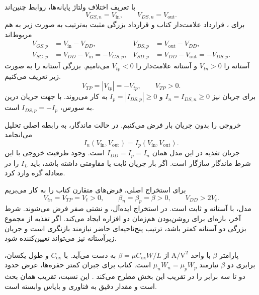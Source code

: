 با تعریف اختلاف ولتاژ پایانه‌ها، روابط  چنین‌اند
\begin{equation}
 V_{GS,n}=V_{\mathrm{in}},\qquad
 V_{DS,n}=V_{\mathrm{out}}.
 \label{eq:inverter-n-voltages}
\end{equation}
برای ، قرارداد علامت‌دار کتاب و قرارداد بزرگی مثبت به‌ترتیب
به صورت زیر به هم مربوط‌اند
\begin{align}
 V_{GS,p}&=V_{\mathrm{in}}-V_{DD},&
 V_{DS,p}&=V_{\mathrm{out}}-V_{DD},
 \label{eq:inverter-p-signed}\\
 V_{SG,p}&=V_{DD}-V_{\mathrm{in}}=-V_{GS,p},&
 V_{SD,p}&=V_{DD}-V_{\mathrm{out}}=-V_{DS,p}.
 \label{eq:inverter-p-magnitudes}
\end{align}
آستانه  را \(V_{tn}>0\) و آستانه علامت‌دار
 را \(V_{tp}<0\) می‌نامیم. بزرگی آستانه را به صورت زیر
تعریف می‌کنیم.
\[
 V_{TP}=|V_{tp}|=-V_{tp},\qquad V_{TP}>0.
\]
برای جریان نیز
\(I_n=I_{DS,n}\ge0\) و \(I_p=|I_{DS,p}|\ge0\) به کار می‌روند.
با جهت جریان درین به سورس، \(I_{DS,p}=-I_p\) است.

خروجی را بدون جریان بار  فرض می‌کنیم. در حالت ماندگار،
 به رابطه اصلی تحلیل می‌انجامد
\begin{equation}
 \boxed{I_n(V_{\mathrm{in}},V_{\mathrm{out}})
       =I_p(V_{\mathrm{in}},V_{\mathrm{out}})}.
 \label{eq:inverter-kcl}
\end{equation}
جریان تغذیه در این مدل همان \(I_{DD}=I_p=I_n\) است. وجود ظرفیت
خروجی با این شرط ماندگار سازگار است. اگر بار جریان ثابت یا مقاومتی
داشته باشد، باید \(I_L\) را در معادله گره وارد کرد.

برای استخراج اصلی، فرض‌های متقارن کتاب را به کار می‌بریم
\begin{equation}
 V_{tn}=V_{TP}=V_t>0,\qquad
 \beta_n=\beta_p=\beta>0,\qquad V_{DD}>2V_t.
 \label{eq:inverter-symmetry}
\end{equation}
مدل،  با آستانه و  ثابت است.
در استخراج ایده‌آل،  و نشتی صفر فرض می‌شوند. شرط آخر،
بازه‌ای برای روشن‌بودن هم‌زمان دو افزاره ایجاد می‌کند. اگر تغذیه
از مجموع بزرگی دو آستانه کمتر باشد، ترتیب پنج‌ناحیه‌ای حاضر
نیازمند بازنگری است و جریان زیرآستانه نیز می‌تواند تعیین‌کننده شود.

پارامتر \(\beta\) با واحد \(\unit{\ampere\per\volt\squared}\)
از \(\beta=\mu C_{\mathrm{ox}}W/L\) به دست می‌آید. با
\(C_{\mathrm{ox}}\) و طول یکسان، برابری دو \(\beta\) نیازمند
\(\mu_nW_n=\mu_pW_p\) است. کتاب برای جبران 
کمتر حفره‌ها، عرض  حدود دو تا سه برابر  را در
تقریب این بخش مطرح می‌کند \cite[صفحه ۸۸]{weste}. این نسبت،
تقریب همان بحث است و مقدار دقیق به فناوری و بایاس وابسته است.

